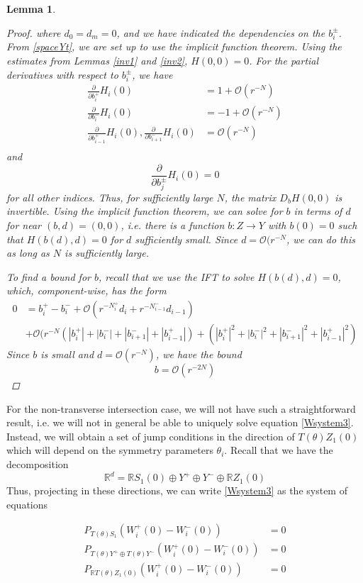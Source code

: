 \documentclass[12pt]{article}
\def\R{{\mathbb R}}
\newtheorem{lemma}{Lemma}
\begin{document}
\begin{lemma}
\begin{proof}
where $d_0 = d_m = 0$, and we have indicated the dependencies on the $b_i^\pm$. From \eqref{spaceYt}, we are set up to use the implicit function theorem. Using the estimates from Lemmas \ref{inv1} and \ref{inv2}, $H(0, 0) = 0$. For the partial derivatives with respect to $b_i^\pm$, we have
\begin{align*}
\frac{\partial}{\partial b_i^+}H_i(0) &= 1 + \mathcal{O}(r^{-N})  \\
\frac{\partial}{\partial b_i^-}H_i(0) &= -1 + \mathcal{O}(r^{-N}) \\
\frac{\partial}{\partial b_{i-1}^+}H_i(0),
\frac{\partial}{\partial b_{i+1}^-}H_i(0) &= \mathcal{O}(r^{-N}) \\
\end{align*}
and 
\[
\frac{\partial}{\partial b_j^\pm}H_i(0) = 0
\]
for all other indices. Thus, for sufficiently large $N$, the matrix $D_b H(0,0)$ is invertible. Using the implicit function theorem, we can solve for $b$ in terms of $d$ for near $(b,d) = (0, 0)$, i.e. there is a function $b: Z \rightarrow Y$ with $b(0) = 0$ such that $H(b(d),d) = 0$ for $d$ sufficiently small. Since $d = \mathcal{O}(r^{-N}$, we can do this as long as $N$ is sufficiently large.

To find a bound for $b$, recall that we use the IFT to solve $H(b(d),d) = 0$, which, component-wise, has the form
\begin{align*}
0 &= b_i^+ - b_i^- + \mathcal{O}(r^{-N_i^+} d_i + r^{-N_{i-1}^-} d_{i-1}) \\
&+ \mathcal{O}( r^{-N}(|b_i^+| + |b_i^-| + |b_{i+1}^-| + |b_{i-1}^+|)
+ (|b_i^+|^2 + |b_i^-|^2 + |b_{i+1}^-|^2 + |b_{i-1}^+|^2)
\end{align*}
Since $b$ is small and $d = \mathcal{O}(r^{-N})$, we have the bound
\[
b = \mathcal{O}(r^{-2N})
\]
\end{proof}
\end{lemma}

For the non-transverse intersection case, we will not have such a straightforward result, i.e. we will not in general be able to uniquely solve equation \eqref{Wsystem3}. Instead, we will obtain a set of jump conditions in the direction of $T(\theta) Z_1(0)$ which will depend on the symmetry parameters $\theta_i$. Recall that we have the decomposition
\[
\R^d = \R S_1(0) \oplus Y^+ \oplus Y^- \oplus \R Z_1(0)
\]
Thus, projecting in these directions, we can write \eqref{Wsystem3} as the system of equations

\begin{align}
P_{T(\theta)S_1}\left( W_i^+(0) - W_i^-(0) \right) &= 0 \label{jumpS1} \\
P_{T(\theta)Y^+ \oplus T(\theta)Y^-}\left( W_i^+(0) - W_i^-(0) \right) &= 0 \label{jumpnonZ} \\
P_{\R T(\theta)Z_1(0)} \left( W_i^+(0) - W_i^-(0) \right) &= 0 \label{jumpZ}
\end{align}
\end{document}

